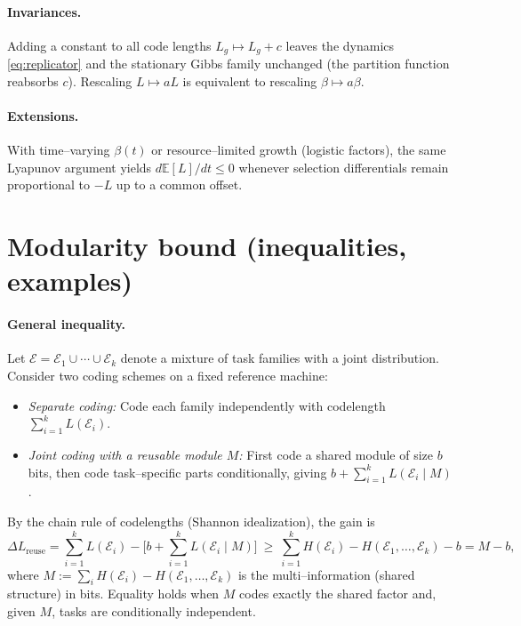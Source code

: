 \documentclass[11pt,a4paper]{article}
\begin{document}
\paragraph{Invariances.}
Adding a constant to all code lengths $L_g\mapsto L_g+c$ leaves the dynamics \eqref{eq:replicator} and the stationary Gibbs family unchanged (the partition function reabsorbs $c$). Rescaling $L\mapsto aL$ is equivalent to rescaling $\beta\mapsto a\beta$.

\paragraph{Extensions.}
With time–varying $\beta(t)$ or resource–limited growth (logistic factors), the same Lyapunov argument yields $d\mathbb{E}[L]/dt \le 0$ whenever selection differentials remain proportional to $-L$ up to a common offset.

\section{Modularity bound (inequalities, examples)}
\label{app:modularity}

\paragraph{General inequality.}
Let $\mathcal{E}=\mathcal{E}_1\cup\cdots\cup\mathcal{E}_k$ denote a mixture of task families with a joint distribution. Consider two coding schemes on a fixed reference machine:
\begin{itemize}
\item \emph{Separate coding:} Code each family independently with codelength $\sum_{i=1}^k L(\mathcal{E}_i)$.
\item \emph{Joint coding with a reusable module $M$:} First code a shared module of size $b$ bits, then code task–specific parts conditionally, giving $b+\sum_{i=1}^k L(\mathcal{E}_i\mid M)$.
\end{itemize}
By the chain rule of codelengths (Shannon idealization), the gain is
\[
\Delta L_{\text{reuse}}
= \sum_{i=1}^k L(\mathcal{E}_i) - \Big[b + \sum_{i=1}^k L(\mathcal{E}_i\mid M)\Big]
\ \ge\ \sum_{i=1}^k H(\mathcal{E}_i) - H(\mathcal{E}_1,\dots,\mathcal{E}_k) - b
= M - b,
\]
where $M:=\sum_i H(\mathcal{E}_i) - H(\mathcal{E}_1,\dots,\mathcal{E}_k)$ is the multi–information (shared structure) in bits. Equality holds when $M$ codes exactly the shared factor and, given $M$, tasks are conditionally independent.
\end{document}
